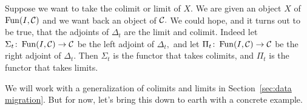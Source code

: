 \documentclass[CT4S-EN-RU]{subfiles}
\begin{document}
\begin{blockRUS}
\end{blockRUS}

\begin{blockENG}
Suppose we want to take the colimit or limit of $X.$ We are given an object $X$ of $\operatorname{Fun}(I,\mathcal{C})$ and we want back an object of $\mathcal{C}.$ We could hope, and it turns out to be true, that the adjoints of $\Delta_t$ are the limit and colimit. Indeed let $\Sigma_t\colon\operatorname{Fun}(I,\mathcal{C})\rightarrow\mathcal{C}$ be the left adjoint of $\Delta_t,$ and let $\Pi_t\colon\operatorname{Fun}(I,\mathcal{C})\rightarrow\mathcal{C}$ be the right adjoint of $\Delta_t.$ Then $\Sigma_t$ is the functor that takes colimits, and $\Pi_t$ is the functor that takes limits.
\end{blockENG}

\begin{blockRUS}
\end{blockRUS}

\begin{blockENG}
We will work with a generalization of colimits and limits in Section~\ref{sec:data migration}. But for now, let's bring this down to earth with a concrete example.
\end{blockENG}

\begin{blockRUS}
\end{blockRUS}
\end{document}

